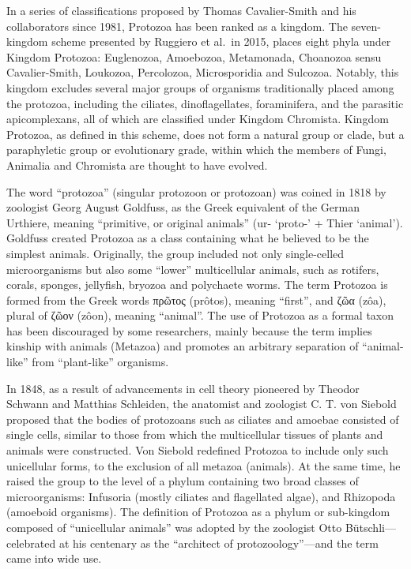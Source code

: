 In a series of classifications proposed by Thomas Cavalier-Smith and his collaborators since 1981, Protozoa has been ranked as a kingdom. The seven-kingdom scheme presented by Ruggiero et al.~in 2015, places eight phyla under Kingdom Protozoa: Euglenozoa, Amoebozoa, Metamonada, Choanozoa sensu Cavalier-Smith, Loukozoa, Percolozoa, Microsporidia and Sulcozoa. Notably, this kingdom excludes several major groups of organisms traditionally placed among the protozoa, including the ciliates, dinoflagellates, foraminifera, and the parasitic apicomplexans, all of which are classified under Kingdom Chromista. Kingdom Protozoa, as defined in this scheme, does not form a natural group or clade, but a paraphyletic group or evolutionary grade, within which the members of Fungi, Animalia and Chromista are thought to have evolved.

The word ``protozoa'' (singular protozoon or protozoan) was coined in 1818 by zoologist Georg August Goldfuss, as the Greek equivalent of the German Urthiere, meaning ``primitive, or original animals'' (ur- `proto-' + Thier `animal'). Goldfuss created Protozoa as a class containing what he believed to be the simplest animals. Originally, the group included not only single-celled microorganisms but also some ``lower'' multicellular animals, such as rotifers, corals, sponges, jellyfish, bryozoa and polychaete worms. The term Protozoa is formed from the Greek words πρῶτος (prôtos), meaning ``first'', and ζῶα (zôa), plural of ζῶον (zôon), meaning ``animal''. The use of Protozoa as a formal taxon has been discouraged by some researchers, mainly because the term implies kinship with animals (Metazoa) and promotes an arbitrary separation of ``animal-like'' from ``plant-like'' organisms.

In 1848, as a result of advancements in cell theory pioneered by Theodor Schwann and Matthias Schleiden, the anatomist and zoologist C. T. von Siebold proposed that the bodies of protozoans such as ciliates and amoebae consisted of single cells, similar to those from which the multicellular tissues of plants and animals were constructed. Von Siebold redefined Protozoa to include only such unicellular forms, to the exclusion of all metazoa (animals). At the same time, he raised the group to the level of a phylum containing two broad classes of microorganisms: Infusoria (mostly ciliates and flagellated algae), and Rhizopoda (amoeboid organisms). The definition of Protozoa as a phylum or sub-kingdom composed of ``unicellular animals'' was adopted by the zoologist Otto Bütschli---celebrated at his centenary as the ``architect of protozoology''---and the term came into wide use.

